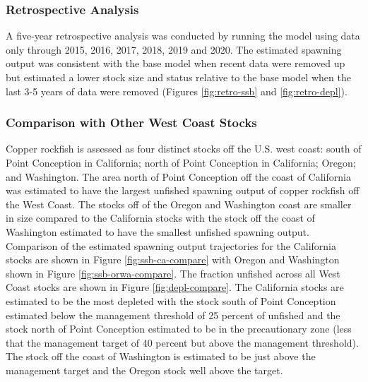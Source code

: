 \documentclass[11pt,
  english,
  a4paper,
]{article}
\begin{document}
\leavevmode\tagmcend\tagstructend\par


\hypertarget{retrospective-analysis}{%
\subsubsection{Retrospective Analysis}\label{retrospective-analysis}}

\leavevmode\tagmcend\tagstructend


A five-year retrospective analysis was conducted by running the model using data only through 2015, 2016, 2017, 2018, 2019 and 2020. The estimated spawning output was consistent with the base model when recent data were removed up but estimated a lower stock size and status relative to the base model when the last 3-5 years of data were removed (Figures \ref{fig:retro-ssb} and \ref{fig:retro-depl}).

\leavevmode\tagmcend\tagstructend\par


\hypertarget{comparison-with-other-west-coast-stocks}{%
\subsubsection{Comparison with Other West Coast Stocks}\label{comparison-with-other-west-coast-stocks}}

\leavevmode\tagmcend\tagstructend


Copper rockfish is assessed as four distinct stocks off the U.S. west coast: south of Point Conception in California; north of Point Conception in California; Oregon; and Washington. The area north of Point Conception off the coast of California was estimated to have the largest unfished spawning output of copper rockfish off the West Coast. The stocks off of the Oregon and Washington coast are smaller in size compared to the California stocks with the stock off the coast of Washington estimated to have the smallest unfished spawning output. Comparison of the estimated spawning output trajectories for the California stocks are shown in Figure \ref{fig:ssb-ca-compare} with Oregon and Washington shown in Figure \ref{fig:ssb-orwa-compare}. The fraction unfished across all West Coast stocks are shown in Figure \ref{fig:depl-compare}. The California stocks are estimated to be the most depleted with the stock south of Point Conception estimated below the management threshold of 25 percent of unfished and the stock north of Point Conception estimated to be in the precautionary zone (less that the management target of 40 percent but above the management threshold). The stock off the coast of Washington is estimated to be just above the management target and the Oregon stock well above the target.
\end{document}
